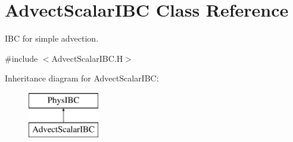 \hypertarget{class_advect_scalar_i_b_c}{\section{Advect\-Scalar\-I\-B\-C Class Reference}
\label{class_advect_scalar_i_b_c}
}


I\-B\-C for simple advection.  




{\ttfamily \#include $<$Advect\-Scalar\-I\-B\-C.\-H$>$}

Inheritance diagram for Advect\-Scalar\-I\-B\-C\-:\begin{figure}[H]
\begin{center}
\leavevmode
\includegraphics[height=2.000000cm]{class_advect_scalar_i_b_c}
\end{center}
\end{figure}
